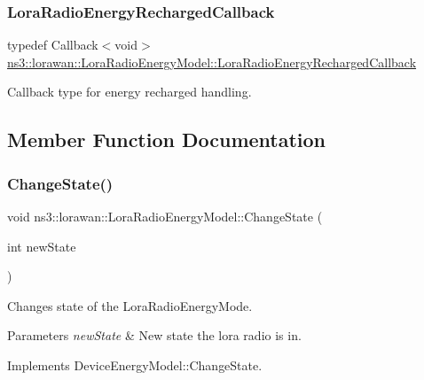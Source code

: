 \subsubsection{\texorpdfstring{Lora\+Radio\+Energy\+Recharged\+Callback}{LoraRadioEnergyRechargedCallback}}
{\footnotesize\ttfamily typedef Callback$<$void$>$ \hyperlink{classns3_1_1lorawan_1_1LoraRadioEnergyModel_aa621913a2b37844d79e4033f85d650dc}{ns3\+::lorawan\+::\+Lora\+Radio\+Energy\+Model\+::\+Lora\+Radio\+Energy\+Recharged\+Callback}}

Callback type for energy recharged handling. 

\subsection{Member Function Documentation}
\mbox{\label{classns3_1_1lorawan_1_1LoraRadioEnergyModel_a6be2e24f42f160bb2cf738baa852ead0}} 
\subsubsection{\texorpdfstring{Change\+State()}{ChangeState()}}
{\footnotesize\ttfamily void ns3\+::lorawan\+::\+Lora\+Radio\+Energy\+Model\+::\+Change\+State (\begin{DoxyParamCaption}\item[{int}]{new\+State }\end{DoxyParamCaption})}



Changes state of the Lora\+Radio\+Energy\+Mode. 


\begin{DoxyParams}{Parameters}
{\em new\+State} & New state the lora radio is in.\\
\hline
\end{DoxyParams}
Implements Device\+Energy\+Model\+::\+Change\+State. \mbox{\label{classns3_1_1lorawan_1_1LoraRadioEnergyModel_a1cbca39200c00dca551d70af876f4f0d}} 
